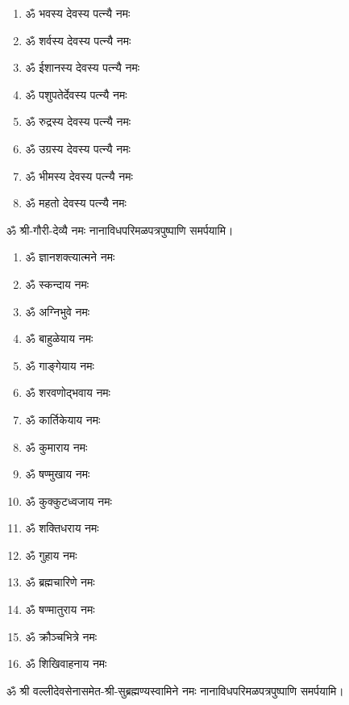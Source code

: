 \begin{center}
\begin{enumerate}
\item ॐ भवस्य देवस्य पत्न्यै नमः
\item ॐ शर्वस्य देवस्य पत्न्यै नमः
\item ॐ ईशानस्य देवस्य पत्न्यै नमः
\item ॐ पशुपतेर्देवस्य पत्न्यै नमः
\item ॐ रुद्रस्य देवस्य पत्न्यै नमः
\item ॐ उग्रस्य देवस्य पत्न्यै नमः
\item ॐ भीमस्य देवस्य पत्न्यै नमः
\item ॐ महतो देवस्य पत्न्यै नमः
\end{enumerate}

ॐ श्री-गौरी-देव्यै नमः नानाविधपरिमळपत्रपुष्पाणि समर्पयामि। \medskip



\begin{multicols}{2}
\begin{enumerate}
\item ॐ ज्ञानशक्त्यात्मने नमः
\item ॐ स्कन्दाय नमः
\item ॐ अग्निभुवे नमः
\item ॐ बाहुळेयाय नमः
\item ॐ गाङ्गेयाय नमः
\item ॐ शरवणोद्भवाय नमः
\item ॐ कार्तिकेयाय नमः
\item ॐ कुमाराय नमः
\item ॐ षण्मुखाय नमः
\item ॐ कुक्कुटध्वजाय नमः
\item ॐ शक्तिधराय नमः
\item ॐ गुहाय नमः
\item ॐ ब्रह्मचारिणे नमः
\item ॐ षण्मातुराय नमः
\item ॐ क्रौञ्चभित्रे नमः
\item ॐ शिखिवाहनाय नमः
\end{enumerate}
\end{multicols}

ॐ श्री वल्लीदेवसेनासमेत-श्री-सुब्रह्मण्यस्वामिने नमः नानाविधपरिमळपत्रपुष्पाणि समर्पयामि। \medskip




\end{center}
